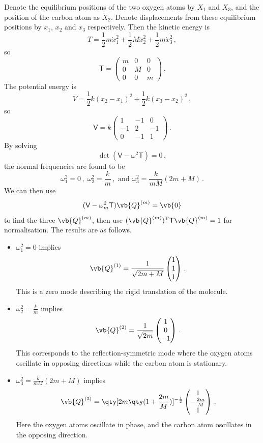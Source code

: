 \documentclass{article}
\theoremstyle{plain}\theoremheaderfont{\normalfont\itshape}\theorembodyfont{\rmfamily}\theoremseparator{.}\newtheorem*{rem}{Remark}\newtheorem*{ex}{Example}\newtheorem*{proof}{Proof}\newtheorem*{altp}{Alternative proof}
\theoremstyle{plain}\theoremheaderfont{\normalfont\bfseries}\theorembodyfont{\rmfamily}\theoremseparator{.}\newtheorem{thm}{Theorem}[section]\newtheorem{lem}[thm]{Lemma}\newtheorem{prop}[thm]{Proposition}\newtheorem*{cor}{Corollary}\newtheorem{defn}[thm]{Definition}\newtheorem{clm}[thm]{Claim}\newtheorem{clminproof}{Claim}
\theoremstyle{break}\theoremheaderfont{\normalfont\itshape}\theorembodyfont{\rmfamily}\theoremseparator{.\medskip}\newtheorem*{proofskip}{Proof}\newtheorem*{exs}{Examples}\newtheorem*{rems}{Remarks}
\theoremstyle{break}\theoremheaderfont{\normalfont\bfseries}\theorembodyfont{\rmfamily}\theoremseparator{.\medskip}\newtheorem{lemskip}[thm]{Lemma}\newtheorem{defnskip}[thm]{Definition}\newtheorem{propskip}[thm]{Proposition}\newtheorem{thmskip}[thm]{Theorem}
\numberwithin{equation}{section}
\newcommand{\tp}{^\mathrm{T}}
\begin{document}
	Denote the equilibrium positions of the two oxygen atoms by \(X_1\) and \(X_3\), and the position of the carbon atom as \(X_2\). Denote displacements from these equilibrium positions by \(x_1\), \(x_2\) and \(x_3\) respectively. Then the kinetic energy is
	\[T=\frac{1}{2}m\dot{x}_1^2+\frac{1}{2}M\dot{x}_2^2+\frac{1}{2}m\dot{x}_3^2\,,\]
	so
	\[\mathsf{T}=\begin{pmatrix}
		m & 0 & 0\\
		0 & M & 0\\
		0 & 0 & m
	\end{pmatrix}\,.\]
	The potential energy is
	\[V=\frac{1}{2}k(x_2-x_1)^2+\frac{1}{2}k(x_3-x_2)^2\,,\]
	so
	\[\mathsf{V}=k\begin{pmatrix}
		1 & -1 & 0\\
		-1 & 2 & -1\\
		0 & -1 & 1
	\end{pmatrix}\,.\]
	By solving
	\[\det(\mathsf{V}-\omega^2\mathsf{T})=0\,,\]
	the normal frequencies are found to be
	\[\omega_1^2=0\,,\;\omega_2^2=\frac{k}{m}\,,\text{ and }\omega_3^2=\frac{k}{mM}(2m+M)\,.\]
	We can then use
	\[(\mathsf{V}-\omega_m^2\mathsf{T})\vb{Q}^{(m)}=\vb{0}\]
	to find the three \(\vb{Q}^{(m)}\), then use \((\vb{Q}^{(m)})\tp\mathsf{T}\vb{Q}^{(m)}=1\) for normalisation. The results are as follows.
	\begin{itemize}
		\item \(\omega_1^2=0\) implies
		\[\vb{Q}^{(1)}=\frac{1}{\sqrt{2m+M}}\begin{pmatrix}
			1 \\ 1 \\ 1
		\end{pmatrix}\,.\]
		This is a zero mode describing the rigid translation of the molecule.
		\item \(\omega_2^2=\frac{k}{m}\) implies
		\[\vb{Q}^{(2)}=\frac{1}{\sqrt{2m}}\begin{pmatrix}
			1 \\ 0 \\ -1
		\end{pmatrix}\,.\]
		This corresponds to the reflection-symmetric mode where the oxygen atoms oscillate in opposing directions while the carbon atom is stationary.
		\item \(\omega_3^2=\frac{k}{mM}(2m+M)\) implies
		\[\vb{Q}^{(3)}=\qty[2m\qty(1+\frac{2m}{M})]^{-\frac{1}{2}}\begin{pmatrix}
			1 \\ -\frac{2m}{M} \\ 1
		\end{pmatrix}\,.\]
		Here the oxygen atoms oscillate in phase, and the carbon atom oscillates in the opposing direction.
	\end{itemize}
\end{document}
